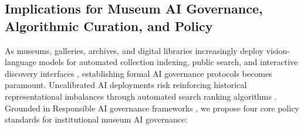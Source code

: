 \documentclass[pdflatex,sn-mathphys-num]{sn-jnl}%
\theoremstyle{thmstyleone}%
\theoremstyle{thmstyletwo}%
\theoremstyle{thmstylethree}%
\begin{document}
\subsection{Implications for Museum AI Governance, Algorithmic Curation, and Policy}
As museums, galleries, archives, and digital libraries increasingly deploy vision-language models for automated collection indexing, public search, and interactive discovery interfaces \cite{fiorucci2020machine, garcia2020bias, srinivasan2021arts}, establishing formal AI governance protocols becomes paramount. Uncalibrated AI deployments risk reinforcing historical representational imbalances through automated search ranking algorithms \cite{zhao2017men, bianchi2023easily, luccioni2023stable}. Grounded in Responsible AI governance frameworks \cite{dignum2019responsible, stahl2021responsible, mitchell2019model, jobin2019global}, we propose four core policy standards for institutional museum AI governance:
\end{document}
